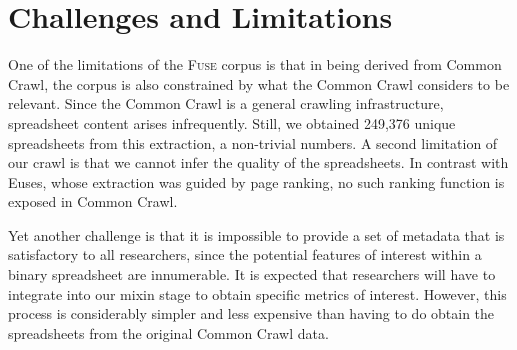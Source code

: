 \documentclass[conference]{IEEEtran}
\begin{document}




\section{Challenges and Limitations}

One of the limitations of the \textsc{Fuse} corpus is that in being derived from Common Crawl, the corpus is also constrained by what the Common Crawl considers to be relevant. Since the Common Crawl is a general crawling infrastructure, spreadsheet content arises infrequently. Still, we obtained 249,376 unique spreadsheets from this extraction, a non-trivial numbers. A second limitation of our crawl is that we cannot infer the quality of the spreadsheets. In contrast with Euses, whose extraction was guided by page ranking, no such ranking function is exposed in Common Crawl.

Yet another challenge is that it is impossible to provide a set of metadata that is satisfactory to all researchers, since the potential features of interest within a binary spreadsheet are innumerable. It is expected that researchers will have to integrate into our mixin stage to obtain specific metrics of interest. However, this process is considerably simpler and less expensive than having to do obtain the spreadsheets from the original Common Crawl data.
\end{document}
